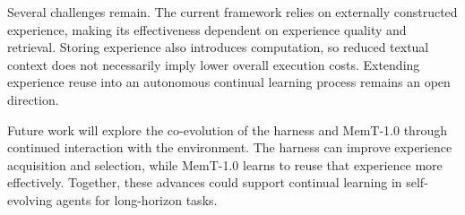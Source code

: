 Several challenges remain. The current framework relies on externally constructed experience, making its effectiveness dependent on experience quality and retrieval. Storing experience also introduces computation, so reduced textual context does not necessarily imply lower overall execution costs. Extending experience reuse into an autonomous continual learning process remains an open direction.

Future work will explore the co-evolution of the harness and MemT-1.0 through continued interaction with the environment. The harness can improve experience acquisition and selection, while MemT-1.0 learns to reuse that experience more effectively. Together, these advances could support continual learning in self-evolving agents for long-horizon tasks.
